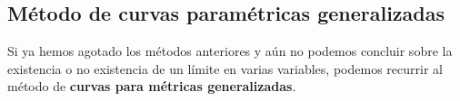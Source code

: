 



\newpage
\subsection{Método de curvas paramétricas generalizadas}

Si ya hemos agotado los métodos anteriores y aún no podemos concluir sobre la existencia o no existencia de un límite en varias variables, podemos recurrir al método de \textbf{curvas para métricas generalizadas}.
\vspace{0.5cm}


